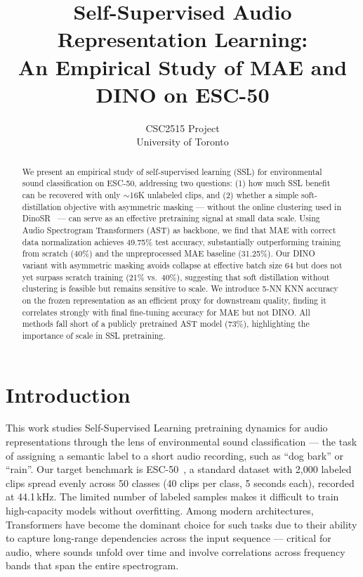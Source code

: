 \documentclass{article}
\title{Self-Supervised Audio Representation Learning:\\
An Empirical Study of MAE and DINO on ESC-50}
\author{%
  CSC2515 Project\\
  University of Toronto\\
}
\begin{document}
\maketitle

\begin{abstract}
We present an empirical study of self-supervised learning (SSL) for environmental sound classification on ESC-50, addressing two questions: (1) how much SSL benefit can be recovered with only $\sim$16K unlabeled clips, and (2) whether a simple soft-distillation objective with asymmetric masking — without the online clustering used in DinoSR~\cite{liu2023dinosr} — can serve as an effective pretraining signal at small data scale. Using Audio Spectrogram Transformers (AST) as backbone, we find that MAE with correct data normalization achieves 49.75\% test accuracy, substantially outperforming training from scratch (40\%) and the unpreprocessed MAE baseline (31.25\%). Our DINO variant with asymmetric masking avoids collapse at effective batch size 64 but does not yet surpass scratch training (21\% vs.\ 40\%), suggesting that soft distillation without clustering is feasible but remains sensitive to scale. We introduce 5-NN KNN accuracy on the frozen representation as an efficient proxy for downstream quality, finding it correlates strongly with final fine-tuning accuracy for MAE but not DINO. All methods fall short of a publicly pretrained AST model (73\%), highlighting the importance of scale in SSL pretraining.
\end{abstract}

\section{Introduction}
\label{sec:intro}

This work studies Self-Supervised Learning pretraining dynamics for audio representations through the lens of environmental sound classification — the task of assigning a semantic label to a short audio recording, such as ``dog bark'' or ``rain''. Our target benchmark is ESC-50~\cite{piczak2015esc}, a standard dataset with 2,000 labeled clips spread evenly across 50 classes (40 clips per class, 5 seconds each), recorded at 44.1\,kHz. The limited number of labeled samples makes it difficult to train high-capacity models without overfitting. Among modern architectures, Transformers have become the dominant choice for such tasks due to their ability to capture long-range dependencies across the input sequence — critical for audio, where sounds unfold over time and involve correlations across frequency bands that span the entire spectrogram.
\end{document}
